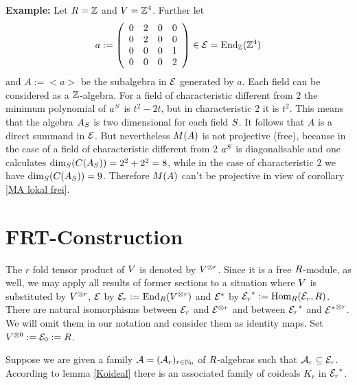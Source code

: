 \documentclass[twoside,12pt]{article}
\begin{document}
{\bf Example:} Let $R={\mathbb Z}$ and $V={\mathbb Z}^4$. Further let
\[a:=\left( \begin{array}{cccc}
0 & 2 & 0 & 0 \\
0 & 2 & 0 & 0 \\
0 & 0 & 0 & 1 \\
0 & 0 & 0 & 2 \\
\end{array} \right)\in {\cal E}={\rm End}_{{\mathbb Z}}{({\mathbb Z}^4)}\]
and $A:=<a>$ be the subalgebra in ${\cal E}$ generated by $a$. 
Each field can be considered as a ${\mathbb Z}$-algebra.
For a field of characteristic different from $2$ the minimum
polynomial of ${a}^{S}$ is
$t^2-2t$, but in characteristic $2$ it is $t^2$. This means that
the algebra ${A}_{S}$ is two dimensional for each field $S$.
It follows that $A$ is a direct summand in ${\cal E}$.
But nevertheless $M(A)$ is not projective (free), because in the case
of a field of characteristic different from $2$
${a}^{S}$ is diagonalisable and one calculates
${\rm dim}_{S}{(C({A}_{S}))}=2^2+2^2=8$, while in the case of characteristic
$2$ we have ${\rm dim}_{S}{(C({A}_{S}))}=9$. Therefore $M(A)$
can't be projective in view of corollary \ref{MA lokal frei}.





















\section{FRT-Construction}



The $r$ fold tensor product of $V$ is denoted by $V^{\otimes r}$. Since
it is a free $R$-module, as well, we may apply all results of
former sections to a situation where $V$ is substituted by $V^{\otimes r}$,
${\cal E}$ by ${\cal E}_r:={\rm End}_{R}{(V^{\otimes r})}$ and ${{\cal E}}^*$ by
${{\cal E}_r}^*:={\rm Hom}_{R}{({\cal E}_r,R)}$. There are
natural isomorphisms between ${\cal E}_r$ and
${{\cal E}}^{\otimes r}$ and between ${{\cal E}_r}^*$ and ${{{\cal E}}^*}^{\otimes r}$. We will omit
them in our notation and consider them as identity maps. Set
$V^{\otimes 0}:={\cal E}_{0}:=R$.\Ab

Suppose we are given a family 
${\cal A}=({\cal A}_r)_{r \in {\mathbb N}_0}$ of $R$-algebras
such that ${\cal A}_r \subseteq {\cal E}_r$. According to lemma \ref{Koideal}
there is an associated family of coideals $K_r$ in ${{\cal E}_r}^*$. 
\end{document}
